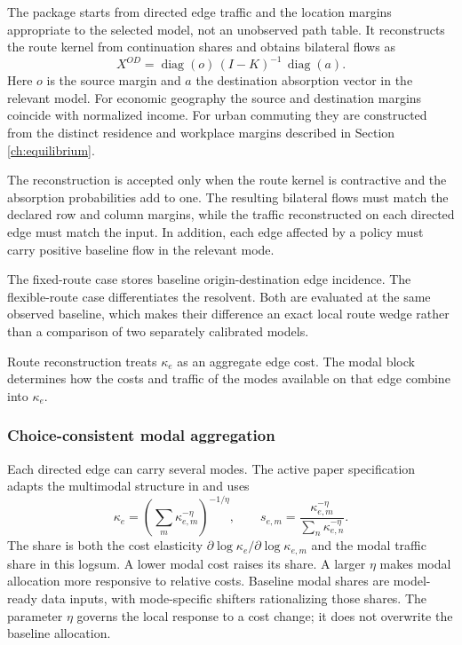 The package starts from directed edge traffic and the location margins
appropriate to the selected model, not an unobserved path table. It
reconstructs the route kernel from continuation shares and obtains bilateral
flows as
\[
 X^{OD}=\operatorname{diag}(o)\,
        (I-K)^{-1}\,
        \operatorname{diag}(a).
\]
Here \(o\) is the source margin and \(a\) the destination absorption vector
in the relevant model. For economic geography the source and destination
margins coincide with normalized income. For urban commuting they are
constructed from the distinct residence and workplace margins described in
Section \ref{ch:equilibrium}.

The reconstruction is accepted only when the route kernel is contractive and
the absorption probabilities add to one. The resulting bilateral flows must
match the declared row and column margins, while the traffic reconstructed on
each directed edge must match the input. In addition, each edge affected by a
policy must carry positive baseline flow in the relevant mode.

The fixed-route case stores baseline origin-destination edge incidence.
The flexible-route case differentiates the resolvent. Both are evaluated at
the same observed baseline, which makes their difference an exact local route
wedge rather than a comparison of two separately calibrated models.

Route reconstruction treats \(\kappa_e\) as an aggregate edge cost. The modal
block determines how the costs and traffic of the modes available on that edge
combine into \(\kappa_e\).

\subsubsection{Choice-consistent modal aggregation}

Each directed edge can carry several modes. The active paper specification
adapts the multimodal structure in \citet{FuchsWong2026Multimodal} and uses
\[
 \kappa_e
 =\left(\sum_m\kappa_{e,m}^{-\eta}\right)^{-1/\eta},
 \qquad
 s_{e,m}
 =\frac{\kappa_{e,m}^{-\eta}}
        {\sum_n\kappa_{e,n}^{-\eta}}.
\]
The share is both the cost elasticity
\(\partial\log\kappa_e/\partial\log\kappa_{e,m}\) and the modal traffic share
in this logsum. A lower modal cost raises its share. A larger
\(\eta\) makes modal allocation more responsive to relative costs.
Baseline modal shares are model-ready data inputs, with mode-specific shifters
rationalizing those shares. The parameter \(\eta\) governs the local response
to a cost change; it does not overwrite the baseline allocation.

